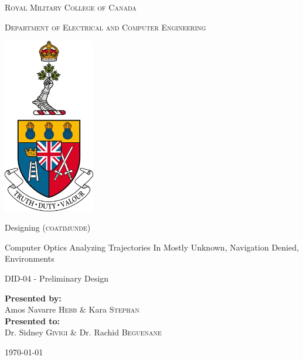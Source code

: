 \documentclass{article}
\begin{document}
	
\begin{titlepage}
	\begin{center}
		\vspace*{1cm}
		
		\LARGE\textsc{Royal Military College of Canada}\normalsize
		
		\vspace{0.2cm}
		
		\textsc{Department of Electrical and Computer Engineering}
		
		\vspace{1.5cm}
		
		\includegraphics[width=0.3\textwidth]{rmcLogo.png}
		
		\vspace{1.5cm}
		
		\LARGE{Designing (\textsc{coatimunde}) \\}
		
		\vspace{0.2cm}
		
		\normalsize{Computer Optics Analyzing Trajectories In Mostly Unknown, Navigation Denied, Environments}
		
		\vspace{0.1cm}
		
		\normalsize{DID-04 - Preliminary Design}
		
		\vfill
		
		\textbf{Presented by:}\\Amos Navarre \textsc{Hebb} \& Kara \textsc{Stephan}\\
		\vspace{0.8cm}
		\textbf{Presented to:}\\Dr. Sidney \textsc{Givigi} \& Dr. Rachid \textsc{Beguenane}
		\vspace{0.8cm}
		
		\today
		
	\end{center}
\end{titlepage}
\end{document}
